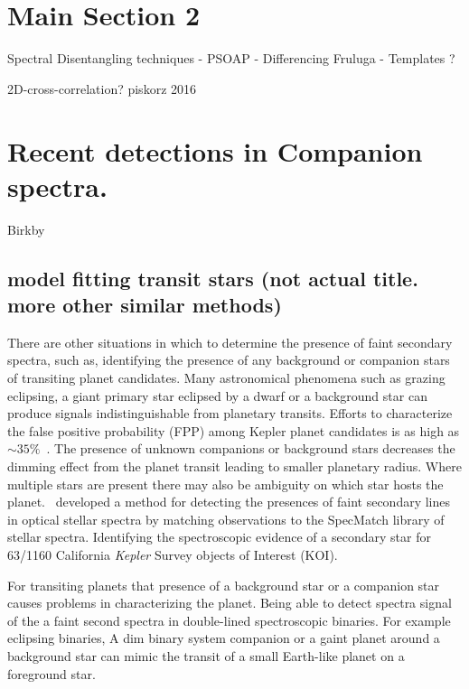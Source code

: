 
\section{Main Section 2}


Spectral Disentangling techniques
- PSOAP
- Differencing Fruluga
- Templates ?


2D-cross-correlation?   piskorz 2016


\section{Recent detections in Companion spectra.}


Birkby


\subsection{model fitting transit stars (not actual title. more other similar methods)}
There are other situations in which to determine the presence of faint secondary spectra, such as, identifying the presence of any background or companion stars of transiting planet candidates. Many astronomical phenomena such as grazing eclipsing, a giant primary star eclipsed by a dwarf or a background star can produce signals indistinguishable from planetary transits. Efforts to characterize the false positive probability (FPP) among Kepler planet candidates is as high as $\sim35\%$~\citep{santerne_sophie_2012}. The presence of unknown companions or background stars decreases the dimming effect from the planet transit leading to smaller planetary radius. Where multiple stars are present there may also be ambiguity on which star hosts the planet.~\citet{kolbl_detection_2015} developed a method for detecting the presences of faint secondary lines in optical stellar spectra by matching observations to the SpecMatch library of stellar spectra. Identifying the spectroscopic evidence of a secondary star for 63/1160 California \emph{Kepler} Survey objects of Interest (KOI).


For transiting planets that presence of a background star or a companion star causes problems in characterizing the planet. Being able to detect spectra signal of the a faint second spectra in double-lined spectroscopic binaries.
For example eclipsing binaries,
A dim binary system companion or a gaint planet around a background star can mimic the transit of a small Earth-like planet on a foreground star.






